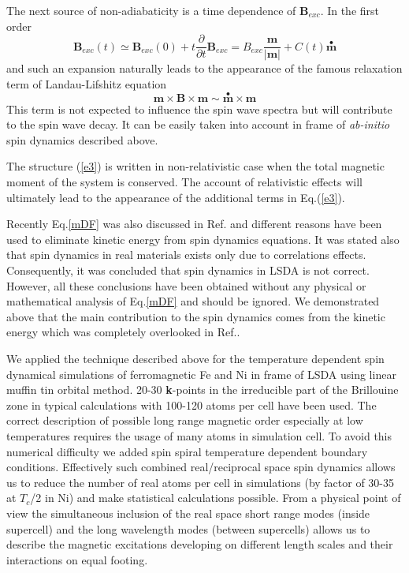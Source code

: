 \documentclass[aps,preprint,twocolumn,10pt]{revtex4}%
\begin{document}
The next source of non-adiabaticity is a time dependence of $\mathbf{B}_{exc}%
$. In the first order%
\begin{equation}
\mathbf{B}_{exc}\left(  t\right)  \simeq\mathbf{B}_{exc}\left(  0\right)
+t\frac{\partial}{\partial t}\mathbf{B}_{exc}=B_{exc}\frac{\mathbf{m}%
}{\left\vert \mathbf{m}\right\vert }+C(t)\overset{\bullet}{\mathbf{m}}
\label{e2}%
\end{equation}
and such an expansion naturally leads to the appearance of the famous
relaxation term of Landau-Lifshitz equation%
\begin{equation}
\mathbf{m}\times\mathbf{B}\times\mathbf{m\sim}\overset{\bullet}{\mathbf{m}%
}\times\mathbf{m} \label{e3}%
\end{equation}
This term is not expected to influence the spin wave spectra but will
contribute to the spin wave decay. It can be easily taken into account in
frame of \textit{ab-initio} spin dynamics described above.

The structure (\ref{e3}) is written in non-relativistic case when the total
magnetic moment of the system is conserved. The account of relativistic
effects will ultimately lead to the appearance of the additional terms in
Eq.(\ref{e3}).

Recently Eq.\ref{mDF} was also discussed in Ref.\cite{GY} and different
reasons have been used to eliminate kinetic energy from spin dynamics
equations. It was stated also that spin dynamics in real materials exists only
due to correlations effects. Consequently, it was concluded that spin dynamics
in LSDA is not correct. However, all these conclusions have been obtained
without any physical or mathematical analysis of Eq.\ref{mDF} and should be
ignored. We demonstrated above that the main contribution to the spin dynamics
comes from the kinetic energy which was completely overlooked in Ref.\cite{GY}.

We applied the technique described above for the temperature dependent spin
dynamical simulations of ferromagnetic Fe and Ni in frame of LSDA using linear
muffin tin orbital method. 20-30 \textbf{k}-points in the irreducible part of
the Brillouine zone in typical calculations with 100-120 atoms per cell have
been used. The correct description of possible long range magnetic order
especially at low temperatures requires the usage of many atoms in simulation
cell. To avoid this numerical difficulty we added spin spiral temperature
dependent boundary conditions\cite{SS}. Effectively such combined
real/reciprocal space spin dynamics allows us to reduce the number of real
atoms per cell in simulations (by factor of 30-35 at $T_{c}$/2 in Ni) and make
statistical calculations possible. From a physical point of view the
simultaneous inclusion of the real space short range modes (inside supercell)
and the long wavelength modes (between supercells) allows us to describe the
magnetic excitations developing on different length scales and their
interactions on equal footing.
\end{document}
